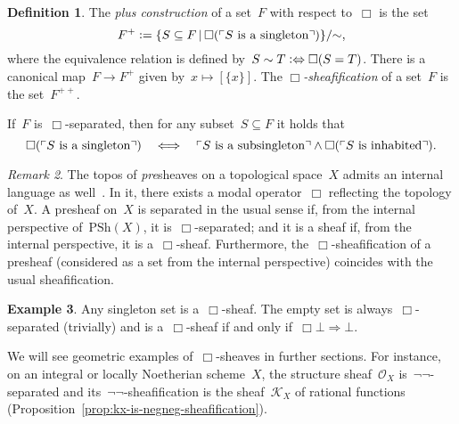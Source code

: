 \documentclass[10pt,reqno,a4paper]{amsbook}
\theoremstyle{definition}
\newtheorem{defn}{Definition}[section]
\newtheorem{ex}[defn]{Example}
\theoremstyle{plain}
\theoremstyle{remark}
\newtheorem{rem}[defn]{Remark}
\renewcommand{\O}{\mathcal{O}}
\newcommand{\K}{\mathcal{K}}
\newcommand{\PSh}{\mathrm{PSh}}
\newcommand{\?}{\,{:}\,}
\renewcommand{\_}{\mathpunct{.}\,}
\newcommand{\speak}[1]{\ulcorner\text{\textnormal{#1}}\urcorner}
\newcommand{\defeq}{\vcentcolon=}
\begin{document}
\begin{defn}\label{defn:plus-construction}
The \emph{plus construction} of a set~$F$ with respect to~$\Box$ is the set
\[ F^+ \defeq \{ S \subseteq F \,|\, \Box(\speak{$S$ is a singleton}) \}/{\sim},
\]
where the equivalence relation is defined by~$S \sim T \vcentcolon\Leftrightarrow
\Box(S = T)$. There is a canonical map~$F \to F^+$ given by~$x \mapsto
[\{x\}]$. The \emph{$\Box$-sheafi\-fi\-ca\-tion} of a set~$F$ is the
set~$F^{++}$.
\end{defn}

If~$F$ is~$\Box$-separated, then for any subset~$S \subseteq F$ it holds
that
\[ \Box(\speak{$S$ is a singleton}) \quad\Longleftrightarrow\quad
  \speak{$S$ is a subsingleton} \wedge \Box(\speak{$S$ is inhabited}). \]

\begin{rem}The topos of \emph{pre}sheaves on a topological space~$X$ admits an
internal language as well~\cite[Section~VI.7, discussion after
Theorem~1]{moerdijk-maclane:sheaves-logic}. In it, there
exists a modal operator~$\Box$ reflecting the topology of~$X$. A presheaf on~$X$ is separated
in the usual sense if, from the internal perspective of~$\PSh(X)$, it
is~$\Box$-separated; and it is a sheaf if, from the internal perspective, it
is a~$\Box$-sheaf. Furthermore, the~$\Box$-sheafification of a presheaf
(considered as a set from the internal perspective) coincides with the usual
sheafification.\end{rem}

\begin{ex}\label{ex:special-sets-sheaves}
Any singleton set is a~$\Box$-sheaf. The empty set is
always~$\Box$-separated (trivially) and is a~$\Box$-sheaf if and only
if~$\Box\bot \Rightarrow \bot$.\end{ex}

We will see geometric examples of~$\Box$-sheaves in further sections.
For instance, on an integral or locally Noetherian scheme~$X$, the structure sheaf~$\O_X$
is~$\neg\neg$-separated and its~$\neg\neg$-sheafification is the sheaf~$\K_X$
of rational functions (Proposition~\ref{prop:kx-is-negneg-sheafification}).
\end{document}
